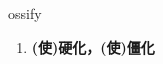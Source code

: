 
\begin{frame}
{\huge ossify}
\begin{center}
\begin{enumerate}\Large
  \item \textbf{(使)硬化，(使)僵化}
\end{enumerate}
\end{center}
\end{frame}
